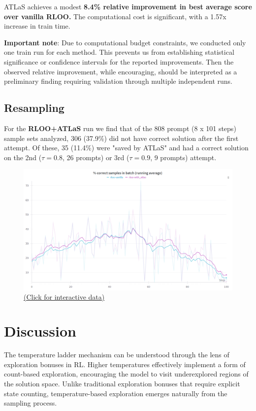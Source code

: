 \documentclass{article}
\begin{document}
ATLaS achieves a modest \textbf{8.4\% relative improvement in best average score over vanilla RLOO.} The computational cost is significant, with a 1.57x increase in train time.

\textbf{Important note}: Due to computational budget constraints, we conducted only one train run for each method. This prevents us from establishing statistical significance or confidence intervals for the reported improvements. Then the observed relative improvement, while encouraging, should be interpreted as a preliminary finding requiring validation through multiple independent runs.

\subsection{Resampling}

For the \textbf{RLOO+ATLaS} run we find that of the 808 prompt (8 x 101 steps) sample sets analyzed, 306 (37.9\%) did not have correct solution after the first attempt. Of these, 35 (11.4\%) were "saved by ATLaS" and had a correct solution on the 2nd ($\tau = 0.8$, 26 prompts) or 3rd ($\tau = 0.9$, 9 prompts) attempt.

\begin{figure}[H]
  \centering
  \includegraphics[width=0.8\columnwidth]{images/correct.png}
  \vspace{-10pt}
  \caption*{\href{https://wandb.ai/jonathanalgar/countdown-rl-prod/workspace/panel/qbxudix1v}{(Click for interactive data)}}
\end{figure}

\section{Discussion}

The temperature ladder mechanism can be understood through the lens of exploration bonuses in RL. Higher temperatures effectively implement a form of count-based exploration, encouraging the model to visit underexplored regions of the solution space. Unlike traditional exploration bonuses that require explicit state counting, temperature-based exploration emerges naturally from the sampling process.
\end{document}
